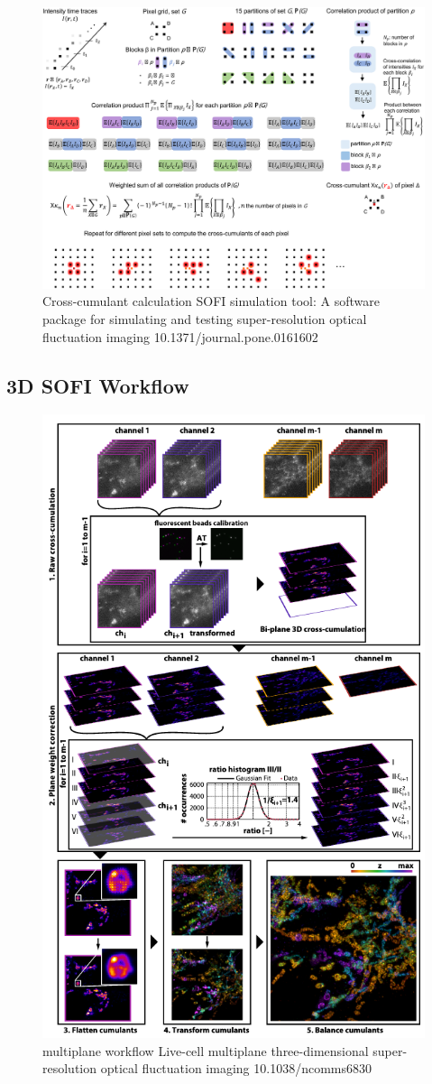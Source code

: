 \documentclass[final]{scrartcl}
\begin{document}
\begin{figure}[h]
  \includegraphics[width=0.8\linewidth]{pone.0161602.g003.PNG_L.png}
  \caption{Cross-cumulant calculation SOFI simulation tool: A software package for simulating and testing super-resolution optical fluctuation imaging 10.1371/journal.pone.0161602}
  \label{fig:CCC}
\end{figure}

\subsection{3D SOFI Workflow}

\begin{figure}[h]
  \includegraphics[width=0.7\linewidth]{multiplaneWorkflow.png}
  \caption{multiplane workflow Live-cell multiplane three-dimensional super-resolution optical fluctuation imaging 10.1038/ncomms6830}
  \label{fig:CCC}
\end{figure}
\end{document}
